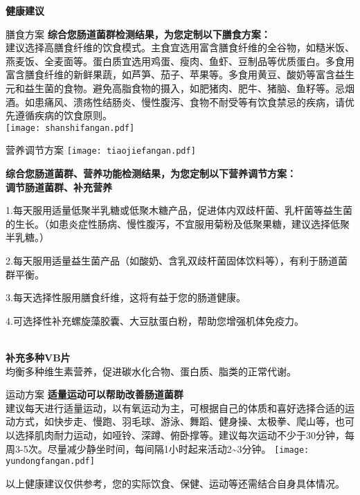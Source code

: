 

\usepackage{graphicx}
\graphicspath{{cores/}}



\vspace*{5mm}
\setlength{\arrayrulewidth}{1pt}
\fontsize{9.3pt}{11pt}\selectfont
\color{gray2}

\centerline{\bf\sanhao 健康建议}

\vspace*{2mm}

\begin{LRaside}[.20]{膳食方案}
{\bf *综合您肠道菌群检测结果，为您定制以下膳食方案：}\\
{\indent 建议选择高膳食纤维的饮食模式。主食宜选用富含膳食纤维的全谷物，如糙米饭、燕麦饭、全麦面等。蛋白质宜选用鸡蛋、瘦肉、鱼虾、豆制品等优质蛋白。多食用富含膳食纤维的新鲜果蔬，如芦笋、茄子、苹果等。多食用黄豆、酸奶等富含益生元和益生菌的食物。避免高脂食物的摄入，如肥猪肉、肥牛、猪脑、鱼籽等。忌烟酒。如患痛风、溃疡性结肠炎、慢性腹泻、食物不耐受等有饮食禁忌的疾病，请优先遵循疾病的饮食原则。}\\
\asidebreak %
\noindent
\texttt{[image: shanshifangan.pdf]}

\end{LRaside}


\begin{LRaside}[.70]{营养调节方案}
\noindent
\texttt{[image: tiaojiefangan.pdf]}

\asidebreak %
{\bf *综合您肠道菌群、营养功能检测结果，为您定制以下营养调节方案：}\\
{\bf 调节肠道菌群、补充营养}\\{\indent 1.每天服用适量低聚半乳糖或低聚木糖产品，促进体内双歧杆菌、乳杆菌等益生菌的生长。（如患炎症性肠病、慢性腹泻，不宜服用菊粉及低聚果糖，建议选择低聚半乳糖。）

2.每天服用适量益生菌产品（如酸奶、含乳双歧杆菌固体饮料等），有利于肠道菌群平衡。

3.每天选择性服用膳食纤维，这将有益于您的肠道健康。

4.可选择性补充螺旋藻胶囊、大豆肽蛋白粉，帮助您增强机体免疫力。}\\
{\bf 补充多种VB片}\\{\indent 均衡多种维生素营养，促进碳水化合物、蛋白质、脂类的正常代谢。}\\
\end{LRaside}

\begin{LRaside}[.20]{运动方案}
{\bf *适量运动可以帮助改善肠道菌群}\\
{\indent 建议每天进行适量运动，以有氧运动为主，可根据自己的体质和喜好选择合适的运动方式，如快步走、慢跑、羽毛球、游泳、舞蹈、健身操、太极拳、爬山等，也可以选择肌肉耐力运动，如哑铃、深蹲、俯卧撑等。建议每次运动不少于30分钟，每周3-5次。尽量减少静坐时间，每间隔1小时起来活动2\textasciitilde 3分钟。}
\asidebreak %
\noindent
\texttt{[image: yundongfangan.pdf]}

\end{LRaside}

{\noindent\qihao *以上健康建议仅供参考，您的实际饮食、保健、运动等还需结合自身具体情况。}


